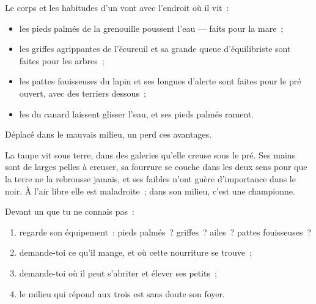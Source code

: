 \begin{proposition}\label{prop:g2:where-animals-live:fit}
Le corps et les habitudes d'un  vont avec l'endroit où il vit~:
\begin{itemize}
  \item les pieds palmés de la grenouille poussent l'eau --- faits
        pour la mare~;
  \item les griffes agrippantes de l'écureuil et sa grande queue
        d'équilibriste sont faites pour les arbres~;
  \item les pattes fouisseuses du lapin et ses longues 
        d'alerte sont faites pour le pré ouvert, avec des terriers
        dessous~;
  \item les  du canard laissent glisser l'eau, et ses pieds
        palmés rament.
\end{itemize}
Déplacé dans le mauvais milieu, un  perd ces avantages.
\end{proposition}
\admitted

\begin{example}\label{ex:g2:where-animals-live:mole}
La taupe vit sous terre, dans des galeries qu'elle creuse sous le
pré. Ses mains sont de larges pelles à creuser, sa fourrure se
couche dans les deux sens pour que la terre ne la rebrousse jamais,
et ses  faibles n'ont guère d'importance dans le noir. À l'air
libre elle est maladroite~; dans son milieu, c'est une championne.
\end{example}

\begin{method}\label{met:g2:where-animals-live:matching}
Devant un  que tu ne connais pas~:
\begin{enumerate}
  \item regarde son équipement~: pieds palmés~? griffes~? ailes~?
        pattes fouisseuses~?
  \item demande-toi ce qu'il mange, et où cette nourriture se
        trouve~;
  \item demande-toi où il peut s'abriter et élever ses petits~;
  \item le milieu qui répond aux trois est sans doute son foyer.
\end{enumerate}
\end{method}

